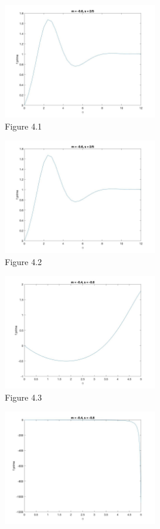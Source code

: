 \documentclass[a4paper,11pt]{article}
\begin{document}
\begin{figure}[H]
\begin{subfigure}{0.5\textwidth}
\includegraphics[width = \linewidth, height = 5cm]{Q4(1).jpg}
\caption{Figure 4.1}
\label{Q4(1)}
\end{subfigure}
\begin{subfigure}{0.5\textwidth}
\includegraphics[width = \linewidth, height = 5cm]{Q4(2).jpg}
\caption{Figure 4.2}
\label{Q4(2)}
\end{subfigure}
\begin{subfigure}{0.5\textwidth}
\includegraphics[width = \linewidth, height = 5cm]{Q4(3).jpg}
\caption{Figure 4.3}
\label{Q4(3)}
\end{subfigure}
\begin{subfigure}{0.5\textwidth}
\includegraphics[width = \linewidth, height = 5cm]{Q4(4).jpg}

\end{subfigure}
\end{figure}
\end{document}

